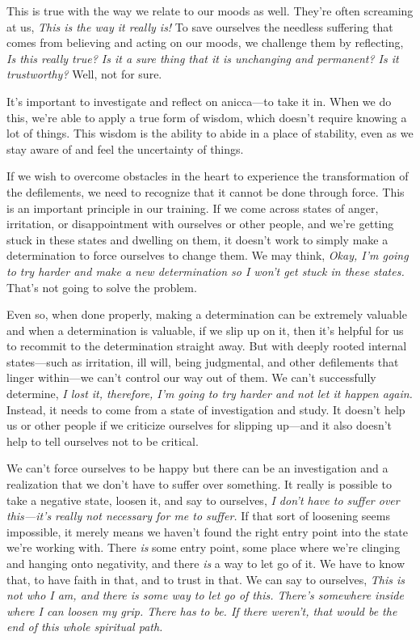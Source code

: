 This is true with the way we relate to our moods as well. They're often 
screaming at us, \emph{This is the way it really is!} To save ourselves 
the needless suffering that comes from believing and acting on our 
moods, we challenge them by reflecting, \emph{Is this really true? Is 
it a sure thing that it is unchanging and permanent? Is it 
trustworthy?} Well, not for sure.

It's important to investigate and reflect on anicca---to take it in. 
When we do this, we're able to apply a true form of wisdom, which 
doesn't require knowing a lot of things. This wisdom is the ability to 
abide in a place of stability, even as we stay aware of and feel the 
uncertainty of things.


If we wish to overcome obstacles in the heart to experience the 
transformation of the defilements, we need to recognize that it cannot 
be done through force. This is an important principle in our training. 
If we come across states of anger, irritation, or disappointment with 
ourselves or other people, and we're getting stuck in these states and 
dwelling on them, it doesn't work to simply make a determination to 
force ourselves to change them. We may think, \emph{Okay, I'm going to 
try harder and make a new determination so I won't get stuck in these 
states.} That's not going to solve the problem.

Even so, when done properly, making a determination can be extremely 
valuable and when a determination is valuable, if we slip up on it, 
then it's helpful for us to recommit to the determination straight 
away. But with deeply rooted internal states---such as irritation, ill 
will, being judgmental, and other defilements that linger within---we 
can't control our way out of them. We can't successfully determine, 
\emph{I lost it, therefore, I'm going to try harder and not let it 
happen again.} Instead, it needs to come from a state of investigation 
and study. It doesn't help us or other people if we criticize ourselves 
for slipping up---and it also doesn't help to tell ourselves not to be 
critical.

We can't force ourselves to be happy but there can be an investigation 
and a realization that we don't have to suffer over something. It 
really is possible to take a negative state, loosen it, and say to 
ourselves, \emph{I don't have to suffer over this---it's really not 
necessary for me to suffer.} If that sort of loosening seems 
impossible, it merely means we haven't found the right entry point into 
the state we're working with. There \emph{is} some entry point, some 
place where we're clinging and hanging onto negativity, and there 
\emph{is} a way to let go of it. We have to know that, to have faith in 
that, and to trust in that. We can say to ourselves, \emph{This is not 
who I am, and there is some way to let go of this. There's somewhere 
inside where I can loosen my grip. There has to be. If there weren't, 
that would be the end of this whole spiritual path.}

